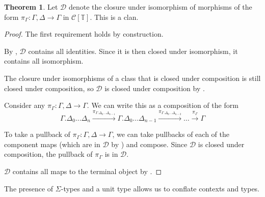\documentclass{article}
\theoremstyle{definition}
\newtheorem{theorem}[definition]{Theorem}
\newcommand{\T}{\mathbb T}
\newcommand{\C}{\mathcal C}
\newcommand{\D}{\mathcal D}
\newcommand{\syncat}[1]{\C [#1]}
\begin{document}
\begin{theorem}\label{thm:syn-clan}
    Let $\mathcal D$ denote the closure under isomorphism of morphisms of the form $\pi_\Gamma : \Gamma, \Delta \to \Gamma$ in $\syncat{\T}$. This is a clan.
\end{theorem}
\begin{proof}
    The first requirement holds by construction.
    
    By , $\D$ contains all identities. Since it is then closed under isomorphism, it contains all isomorphism.

    The closure under isomorphisms of a class that is closed under composition is still closed under composition, so $\D$ is closed under composition by .

    Consider any $\pi_\Gamma : \Gamma, \Delta \to \Gamma$. We can write this as a composition of the form 
    \[ \Gamma.\Delta_0 ... \Delta_n \xrightarrow{\pi_{\Gamma.\Delta_0...\Delta_{n-1}}} \Gamma.\Delta_0...\Delta_{n-1} \xrightarrow{\pi_{\Gamma.\Delta_0...\Delta_{n-2}}} \hdots \xrightarrow{\pi_{\Gamma}} \Gamma \] 

    To take a pullback of $\pi_\Gamma : \Gamma, \Delta \to \Gamma$, we can take pullbacks of each of the component maps (which are in $\D$ by ) and compose. Since $\D$ is closed under composition, the pullback of $\pi_\Gamma $ is in $\D$.

    $\D$ contains all maps to the terminal object by .
\end{proof}

The presence of $\Sigma$-types and a unit type allows us to conflate contexts and types.
\end{document}
